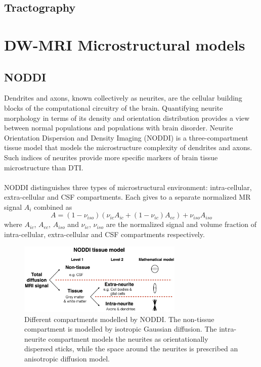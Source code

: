  \subsection{Tractography}

\section{DW-MRI Microstructural models}
 \subsection{NODDI}
 Dendrites and axons, known collectively as neurites, are the cellular building blocks of the computational circuitry of the brain. Quantifying neurite morphology in terms of its density and orientation distribution provides a view between normal populations and populations with brain disorder. \cite{zhang2012noddi}
 Neurite Orientation Dispersion and Density Imaging (NODDI) is a three-compartment tissue model that models the microstructure complexity of dendrites and axons. Such indices of neurites provide more specific markers of brain tissue microstructure than DTI. \cite{zhang2012noddi}
 \\\\
 NODDI distinguishes three types of microstructural environment: intra-cellular, extra-cellular and CSF compartments. Each gives to a separate normalized MR signal $A_i$ combined as
 \begin{equation}
   A=(1-\nu_{iso})(\nu_{ic}A_{ic}+(1-\nu_{ic})A_{ec})+\nu_{iso}A_{iso}
 \end{equation}
 where $A_{ic}$, $A_{ec}$, $A_{iso}$ and $\nu_{ic}$, $\nu_{iso}$ are the normalized signal and volume fraction of intra-cellular, extra-cellular and CSF compartments respectively.
 \begin{figure}[h]
   \centering
   \includegraphics[width=0.70\textwidth]{images/noddi_tissues.jpg}
   \caption{Different compartments modelled by NODDI. The non-tissue compartment is modelled by isotropic Gaussian diffusion. The intra-neurite compartment models the neurites as orientationally dispersed sticks, while the space around the neurites is prescribed an anisotropic diffusion model. \cite{TARIQ2016207}}
   \label{fig:compartments}
 \end{figure}
